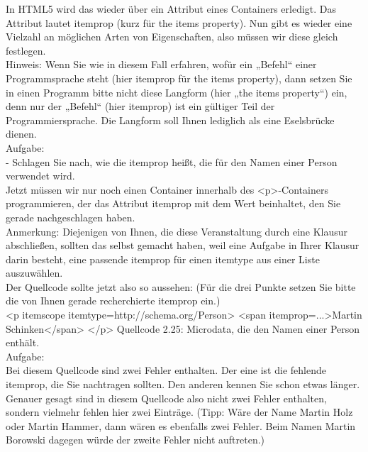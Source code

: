 In HTML5 wird das wieder über ein Attribut eines Containers erledigt. Das Attribut lautet itemprop (kurz für the items property). Nun gibt es wieder eine Vielzahl an möglichen Arten von Eigenschaften, also müssen wir diese gleich festlegen.\\

Hinweis: Wenn Sie wie in diesem Fall  erfahren, wofür ein „Befehl“ einer Programmsprache steht (hier itemprop für the items property), dann setzen Sie in einen Programm bitte nicht diese Langform (hier „the items property“) ein, denn nur der „Befehl“ (hier itemprop) ist ein gültiger Teil der Programmiersprache. Die Langform soll Ihnen lediglich als eine Eselsbrücke dienen.\\

Aufgabe:\\

-	Schlagen Sie nach, wie die itemprop heißt, die für den Namen einer Person verwendet wird.\\

Jetzt müssen wir nur noch einen Container innerhalb des <p>-Containers programmieren, der das Attribut itemprop mit dem Wert beinhaltet, den Sie gerade nachgeschlagen haben. \\

Anmerkung: Diejenigen von Ihnen, die diese Veranstaltung durch eine Klausur abschließen, sollten das selbst gemacht haben, weil eine Aufgabe in Ihrer Klausur darin besteht, eine passende itemprop für einen itemtype aus einer Liste auszuwählen.\\

Der Quellcode sollte jetzt also so aussehen: (Für die drei Punkte setzen Sie bitte die von Ihnen gerade recherchierte itemprop ein.)\\

<p itemscope itemtype=http://schema.org/Person>
<span itemprop=...>Martin Schinken</span>
</p>
Quellcode 2.25: Microdata, die den Namen einer Person enthält.\\

Aufgabe:\\

Bei diesem Quellcode sind zwei Fehler enthalten. Der eine ist die fehlende itemprop, die Sie nachtragen sollten. Den anderen kennen Sie schon etwas länger. Genauer gesagt sind in diesem Quellcode also nicht zwei Fehler enthalten, sondern vielmehr fehlen hier zwei Einträge. (Tipp: Wäre der Name Martin Holz oder Martin Hammer, dann wären es ebenfalls zwei Fehler. Beim Namen Martin Borowski dagegen würde der zweite Fehler nicht auftreten.)\\

